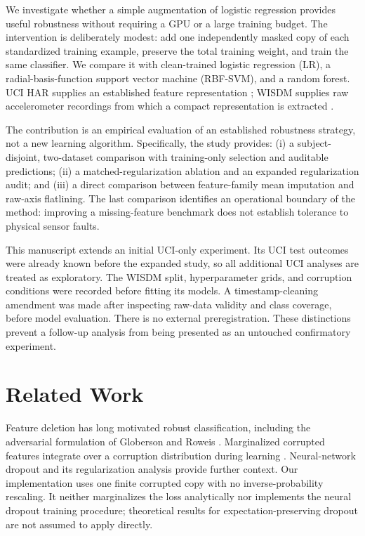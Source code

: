 \documentclass[conference]{IEEEtran}
\begin{document}
We investigate whether a simple augmentation of logistic regression provides useful robustness without requiring a GPU or a large training budget. The intervention is deliberately modest: add one independently masked copy of each standardized training example, preserve the total training weight, and train the same classifier. We compare it with clean-trained logistic regression (LR), a radial-basis-function support vector machine (RBF-SVM), and a random forest. UCI HAR supplies an established feature representation \cite{anguita2013har,uci2013har}; WISDM supplies raw accelerometer recordings from which a compact representation is extracted \cite{kwapisz2010,wisdm2012}.

The contribution is an empirical evaluation of an established robustness strategy, not a new learning algorithm. Specifically, the study provides: (i) a subject-disjoint, two-dataset comparison with training-only selection and auditable predictions; (ii) a matched-regularization ablation and an expanded regularization audit; and (iii) a direct comparison between feature-family mean imputation and raw-axis flatlining. The last comparison identifies an operational boundary of the method: improving a missing-feature benchmark does not establish tolerance to physical sensor faults.

This manuscript extends an initial UCI-only experiment. Its UCI test outcomes were already known before the expanded study, so all additional UCI analyses are treated as exploratory. The WISDM split, hyperparameter grids, and corruption conditions were recorded before fitting its models. A timestamp-cleaning amendment was made after inspecting raw-data validity and class coverage, before model evaluation. There is no external preregistration. These distinctions prevent a follow-up analysis from being presented as an untouched confirmatory experiment.

\section{Related Work}
Feature deletion has long motivated robust classification, including the adversarial formulation of Globerson and Roweis \cite{globerson2006}. Marginalized corrupted features integrate over a corruption distribution during learning \cite{vandermaaten2013corruption}. Neural-network dropout \cite{srivastava2014dropout} and its regularization analysis \cite{wager2013} provide further context. Our implementation uses one finite corrupted copy with no inverse-probability rescaling. It neither marginalizes the loss analytically nor implements the neural dropout training procedure; theoretical results for expectation-preserving dropout are not assumed to apply directly.
\end{document}
